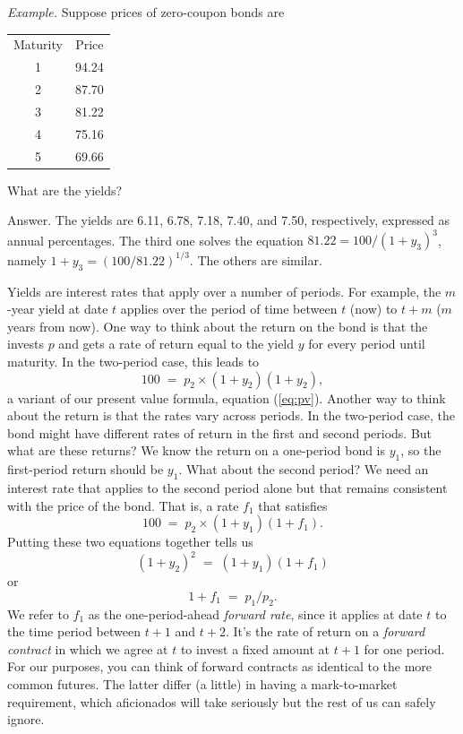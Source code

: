 \documentclass[letterpaper,12pt]{article}
\begin{document}
{\em Example.} Suppose prices of zero-coupon bonds are
%
\begin{center}
\begin{tabular}{cc}
               Maturity        &     Price         \\
                1              &      94.24        \\
                2              &      87.70        \\
                3              &      81.22        \\
                4              &      75.16        \\
                5              &      69.66
\end{tabular}
\end{center}
%
What are the yields?

Answer.  The yields are 6.11, 6.78, 7.18, 7.40, and 7.50,
respectively, expressed as annual percentages.  The third one
solves the equation $ 81.22 = 100/(1+y_3)^3 $, namely $ 1 + y_3 =
(100/81.22)^{1/3} $.  The others are similar.



Yields are interest rates that apply over a number of periods. For
example, the $m$-year yield at date $t$ applies over the period of
time between $t$ (now) to $t+m$ ($m$ years from now).  One way to
think about the return on the bond is that the invests $p$ and
gets a rate of return equal to the yield $y$ for every period
until maturity.  In the two-period case, this leads to
\[
    100 \;=\; p_2 \times (1+y_2) (1+y_2) ,
\]
a variant of our present value formula, equation (\ref{eq:pv}).
Another way to think about the return is that the rates vary
across periods. In the two-period case, the bond might have
different rates of return in the first and second periods. But
what are these returns?  We know the return on a one-period bond
is $y_1$, so the first-period return should be $y_1$.  What about
the second period?  We need an interest rate that applies to the
second period alone but that remains consistent with the price of
the bond. That is, a rate $f_1$ that satisfies
\[
    100 \;=\; p_2 \times (1+y_1) (1+f_1) .
\]
Putting these two equations together tells us
\[
    (1+y_2)^2 \;=\; (1+y_1) (1+f_1)
\]
or
\[
    1+f_1 \;=\; p_1/p_2 .
\]
We refer to $f_1$ as the one-period-ahead {\it forward rate\/},
since it applies at date $t$ to the time period between $t+1$ and
$t+2$. It's the rate of return on a {\it forward contract\/} in
which we agree at $t$ to invest a fixed amount at $t+1$ for one
period.
For our purposes, you can think of forward contracts 
as identical to the more common futures.
The latter differ (a little) in having a mark-to-market requirement, 
which aficionados will take seriously but the rest of us can safely 
ignore.  
\end{document}
